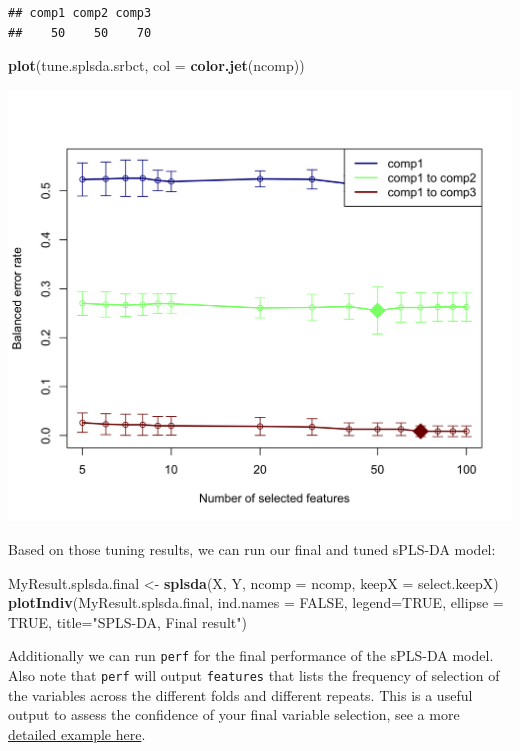 \documentclass[]{book}
\newenvironment{Shaded}{\begin{snugshade}}{\end{snugshade}}
\newcommand{\KeywordTok}[1]{\textcolor[rgb]{0.13,0.29,0.53}{\textbf{#1}}}
\newcommand{\DataTypeTok}[1]{\textcolor[rgb]{0.13,0.29,0.53}{#1}}
\newcommand{\StringTok}[1]{\textcolor[rgb]{0.31,0.60,0.02}{#1}}
\newcommand{\OtherTok}[1]{\textcolor[rgb]{0.56,0.35,0.01}{#1}}
\newcommand{\NormalTok}[1]{#1}
\theoremstyle{definition}
\theoremstyle{definition}
\theoremstyle{definition}
\theoremstyle{remark}
\begin{document}
\begin{verbatim}
## comp1 comp2 comp3 
##    50    50    70
\end{verbatim}

\begin{Shaded}
\begin{Highlighting}[]
\KeywordTok{plot}\NormalTok{(tune.splsda.srbct, }\DataTypeTok{col =} \KeywordTok{color.jet}\NormalTok{(ncomp))}
\end{Highlighting}
\end{Shaded}

\begin{center}\includegraphics[width=0.5\linewidth]{Figures/unnamed-chunk-16-1} \end{center}

Based on those tuning results, we can run our final and tuned sPLS-DA
model:

\begin{Shaded}
\begin{Highlighting}[]
\NormalTok{MyResult.splsda.final <-}\StringTok{ }\KeywordTok{splsda}\NormalTok{(X, Y, }\DataTypeTok{ncomp =}\NormalTok{ ncomp, }\DataTypeTok{keepX =}\NormalTok{ select.keepX)}
\KeywordTok{plotIndiv}\NormalTok{(MyResult.splsda.final, }\DataTypeTok{ind.names =} \OtherTok{FALSE}\NormalTok{, }\DataTypeTok{legend=}\OtherTok{TRUE}\NormalTok{,}
          \DataTypeTok{ellipse =} \OtherTok{TRUE}\NormalTok{, }\DataTypeTok{title=}\StringTok{"SPLS-DA, Final result"}\NormalTok{)}
\end{Highlighting}
\end{Shaded}

Additionally we can run \texttt{perf} for the final performance of the
sPLS-DA model. Also note that \texttt{perf} will output
\texttt{features} that lists the frequency of selection of the variables
across the different folds and different repeats. This is a useful
output to assess the confidence of your final variable selection, see a
more \href{http://mixomics.org/case-studies/splsda-srbct/}{detailed
example here}.
\end{document}
